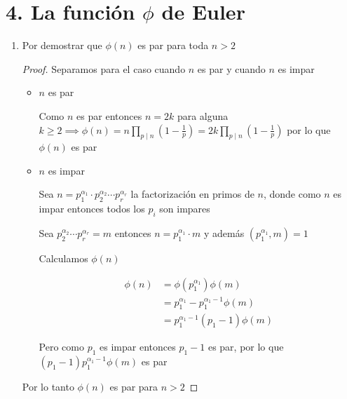 \documentclass[12pt]{article}
\begin{document}
\section*{4. La función $\phi$ de Euler}


    \begin{enumerate}
        \item Por demostrar que $\phi(n)$ es par para toda $n > 2$
        
        
            \begin{proof}
            
            Separamos para el caso cuando $n$ es par y cuando $n$ es impar
            
            
            \begin{itemize}
                \item $n$ es par
                
                Como $n$ es par entonces $n = 2k$ para alguna $k \geq 2 \implies \phi(n) = n \prod_{p \mid n} (1 - \frac{1}{p}) = 2k \prod_{p \mid n} (1 - \frac{1}{p})$ por lo que $\phi(n)$ es par
                
                \item $n$ es impar
                
                Sea $n = p_1^{\alpha_1} \cdot p_2^{\alpha_2} \cdots p_r^{\alpha_r}$ la factorización en primos de $n$, donde como $n$ es impar entonces todos los $p_i$ son impares
                
                Sea $ p_2^{\alpha_2} \cdots p_r^{\alpha_r} = m$ entonces $n =p_1^{\alpha_1} \cdot m $ y además $(p_1^{\alpha_1}, m) = 1$
                
                Calculamos $\phi(n)$
                
                \begin{align*}
                    \phi(n) &= \phi(p_1^{\alpha_1}) \phi(m) \\
                            &= p_1^{\alpha_1} - p_1^{\alpha_1 - 1} \phi(m) \\
                            &= p_1^{\alpha_1 - 1}(p_1 - 1) \phi(m)
                \end{align*}
                
                Pero como $p_1$ es impar entonces $p_1 - 1$ es par, por lo que $(p_1 - 1) p_1^{\alpha_1 - 1} \phi(m)$ es par
            \end{itemize}
            
            Por lo tanto $\phi(n)$ es par para $n > 2$
            

\end{proof}
\end{enumerate}
\end{document}
